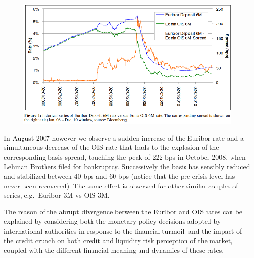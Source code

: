\begin{figure}[h]
\centering
\includegraphics[width=0.7\linewidth]{credit_crunch.png}
\end{figure}

In August 2007 however we observe a sudden increase of the Euribor rate and a simultaneous decrease of the OIS rate that leads to the explosion of the corresponding basis spread, touching the peak of 222 bps in October 2008, when Lehman Brothers filed for bankruptcy. Successively the basis has sensibly reduced and stabilized between 40 bps and 60 bps (notice that the pre-crisis level has never been recovered). The same effect is observed for other similar couples of series, e.g.~Euribor 3M vs OIS 3M.

The reason of the abrupt divergence between the Euribor and OIS rates can be explained by considering both the monetary policy decisions adopted by international authorities in response to the financial turmoil, and the impact of the credit crunch on both credit and liquidity risk perception of the market, coupled with the different financial meaning and dynamics of these rates.


